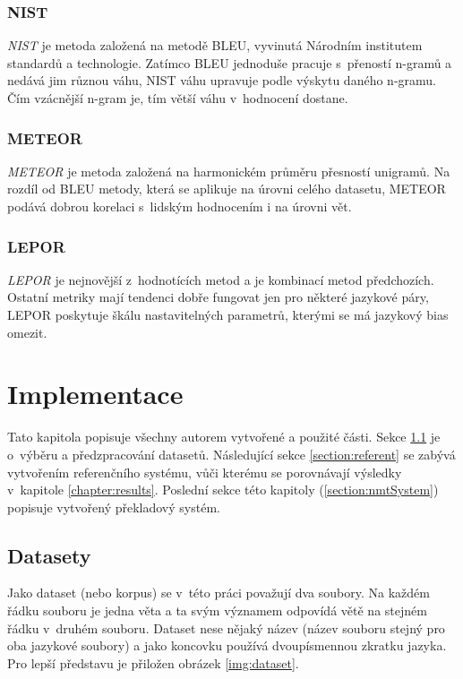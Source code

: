 \subsection{NIST}
\emph{NIST} \cite{NIST} je metoda založená na metodě BLEU, vyvinutá Národním institutem standardů a technologie. Zatímco BLEU jednoduše pracuje s~přeností n-gramů a nedává jim různou váhu, NIST váhu upravuje podle výskytu daného n-gramu. Čím vzácnější n-gram je, tím větší váhu v~hodnocení dostane.


\subsection{METEOR}
\emph{METEOR} \cite{METEOR} je metoda založená na harmonickém průměru přesností unigramů. Na rozdíl od BLEU metody, která se aplikuje na úrovni celého datasetu, METEOR podává dobrou korelaci s~lidským hodnocením i na úrovni vět.

\subsection{LEPOR}
\emph{LEPOR} \cite{LEPOR} je nejnovější z~hodnotících metod a je kombinací metod předchozích. Ostatní metriky mají tendenci dobře fungovat jen pro některé jazykové páry, LEPOR poskytuje škálu nastavitelných parametrů, kterými se má jazykový bias omezit.


\chapter{Implementace} \label{chapter:implementation}
Tato kapitola popisuje všechny autorem vytvořené a použité části. Sekce \ref{section:datasets} je o~výběru a předzpracování datasetů. Následující sekce \ref{section:referent} se zabývá vytvořením referenčního systému, vůči kterému se porovnávají výsledky v~kapitole \ref{chapter:results}. Poslední sekce této kapitoly (\ref{section:nmtSystem}) popisuje vytvořený překladový systém.

\section{Datasety}\label{section:datasets}
Jako dataset (nebo korpus) se v~této práci považují dva soubory. Na každém řádku souboru je jedna věta a ta svým významem odpovídá větě na stejném řádku v~druhém souboru. Dataset nese nějaký název (název souboru stejný pro oba jazykové soubory) a jako koncovku používá dvoupísmennou zkratku jazyka. Pro lepší představu je přiložen obrázek \ref{img:dataset}.

